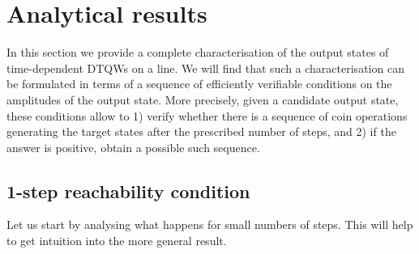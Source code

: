 \section{Analytical results}
\label{sec:reachability_conditions}

In this section we provide a complete characterisation of the output states of time-dependent \acp{DTQW} on a line.
We will find that such a characterisation can be formulated in terms of a sequence of efficiently verifiable conditions on the amplitudes of the output state.
More precisely, given a candidate output state, these conditions allow to 1) verify whether there is a sequence of coin operations generating the target states after the prescribed number of steps, and 2) if the answer is positive, obtain a possible such sequence.

\subsection{1-step reachability condition}
\label{sec:qw_1step_reachability}

Let us start by analysing what happens for small numbers of steps. This will help to get intuition into the more general result.

